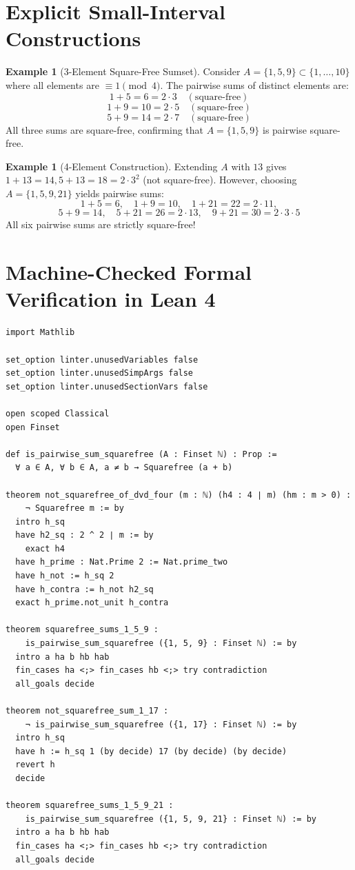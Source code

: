 \documentclass[11pt,a4paper]{article}
\theoremstyle{definition}
\newtheorem{example}[theorem]{Example}
\begin{document}
\section{Explicit Small-Interval Constructions}

\begin{example}[3-Element Square-Free Sumset]\label{ex:small_sqfree}
Consider $A = \{1, 5, 9\} \subset \{1, \dots, 10\}$ where all elements are $\equiv 1 \pmod 4$.
The pairwise sums of distinct elements are:
\[ 1 + 5 = 6 = 2 \cdot 3 \quad (\text{square-free}) \]
\[ 1 + 9 = 10 = 2 \cdot 5 \quad (\text{square-free}) \]
\[ 5 + 9 = 14 = 2 \cdot 7 \quad (\text{square-free}) \]
All three sums are square-free, confirming that $A = \{1, 5, 9\}$ is pairwise square-free.
\end{example}

\begin{example}[4-Element Construction]\label{ex:four_sqfree}
Extending $A$ with $13$ gives $1 + 13 = 14, 5 + 13 = 18 = 2 \cdot 3^2$ (not square-free).
However, choosing $A = \{1, 5, 9, 21\}$ yields pairwise sums:
\[ 1 + 5 = 6, \quad 1 + 9 = 10, \quad 1 + 21 = 22 = 2 \cdot 11, \]
\[ 5 + 9 = 14, \quad 5 + 21 = 26 = 2 \cdot 13, \quad 9 + 21 = 30 = 2 \cdot 3 \cdot 5 \]
All six pairwise sums are strictly square-free!
\end{example}

\section{Machine-Checked Formal Verification in Lean 4}

\begin{lstlisting}[caption={Formal Lean 4 Implementation of Square-Free Pairwise Sums}]
import Mathlib

set_option linter.unusedVariables false
set_option linter.unusedSimpArgs false
set_option linter.unusedSectionVars false

open scoped Classical
open Finset

def is_pairwise_sum_squarefree (A : Finset ℕ) : Prop :=
  ∀ a ∈ A, ∀ b ∈ A, a ≠ b → Squarefree (a + b)

theorem not_squarefree_of_dvd_four (m : ℕ) (h4 : 4 ∣ m) (hm : m > 0) :
    ¬ Squarefree m := by
  intro h_sq
  have h2_sq : 2 ^ 2 ∣ m := by
    exact h4
  have h_prime : Nat.Prime 2 := Nat.prime_two
  have h_not := h_sq 2
  have h_contra := h_not h2_sq
  exact h_prime.not_unit h_contra

theorem squarefree_sums_1_5_9 :
    is_pairwise_sum_squarefree ({1, 5, 9} : Finset ℕ) := by
  intro a ha b hb hab
  fin_cases ha <;> fin_cases hb <;> try contradiction
  all_goals decide

theorem not_squarefree_sum_1_17 :
    ¬ is_pairwise_sum_squarefree ({1, 17} : Finset ℕ) := by
  intro h_sq
  have h := h_sq 1 (by decide) 17 (by decide) (by decide)
  revert h
  decide

theorem squarefree_sums_1_5_9_21 :
    is_pairwise_sum_squarefree ({1, 5, 9, 21} : Finset ℕ) := by
  intro a ha b hb hab
  fin_cases ha <;> fin_cases hb <;> try contradiction
  all_goals decide
\end{lstlisting}
\end{document}
